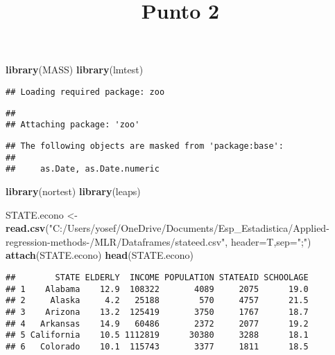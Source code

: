 \documentclass[
]{article}
\title{Punto 2}
\author{}
\date{\vspace{-2.5em}}
\newenvironment{Shaded}{\begin{snugshade}}{\end{snugshade}}
\newcommand{\DataTypeTok}[1]{\textcolor[rgb]{0.13,0.29,0.53}{#1}}
\newcommand{\KeywordTok}[1]{\textcolor[rgb]{0.13,0.29,0.53}{\textbf{#1}}}
\newcommand{\NormalTok}[1]{#1}
\newcommand{\StringTok}[1]{\textcolor[rgb]{0.31,0.60,0.02}{#1}}
\begin{document}
\maketitle

\begin{Shaded}
\begin{Highlighting}[]
\KeywordTok{library}\NormalTok{(MASS)}
\KeywordTok{library}\NormalTok{(lmtest)}
\end{Highlighting}
\end{Shaded}

\begin{verbatim}
## Loading required package: zoo
\end{verbatim}

\begin{verbatim}
## 
## Attaching package: 'zoo'
\end{verbatim}

\begin{verbatim}
## The following objects are masked from 'package:base':
## 
##     as.Date, as.Date.numeric
\end{verbatim}

\begin{Shaded}
\begin{Highlighting}[]
\KeywordTok{library}\NormalTok{(nortest)}
\KeywordTok{library}\NormalTok{(leaps)}
\end{Highlighting}
\end{Shaded}

\begin{Shaded}
\begin{Highlighting}[]
\NormalTok{STATE.econo <-}\StringTok{ }\KeywordTok{read.csv}\NormalTok{(}\StringTok{"C:/Users/yosef/OneDrive/Documents/Esp_Estadistica/Applied-regression-methods-/MLR/Dataframes/stateed.csv"}\NormalTok{, }\DataTypeTok{header=}\NormalTok{T,}\DataTypeTok{sep=}\StringTok{";"}\NormalTok{)}
\KeywordTok{attach}\NormalTok{(STATE.econo)}
\KeywordTok{head}\NormalTok{(STATE.econo)}
\end{Highlighting}
\end{Shaded}

\begin{verbatim}
##        STATE ELDERLY  INCOME POPULATION STATEAID SCHOOLAGE
## 1    Alabama    12.9  108322       4089     2075      19.0
## 2     Alaska     4.2   25188        570     4757      21.5
## 3    Arizona    13.2  125419       3750     1767      18.7
## 4   Arkansas    14.9   60486       2372     2077      19.2
## 5 California    10.5 1112819      30380     3288      18.1
## 6   Colorado    10.1  115743       3377     1811      18.5
\end{verbatim}
\end{document}
